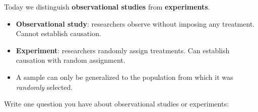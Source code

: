 \documentclass[10pt]{article}
\begin{document}
\noindent Today we distinguish \textbf{observational studies} from \textbf{experiments}.

\vspace{0.14in}

\begin{tcolorbox}[colback=greenbg, colframe=greenacc, boxrule=0.8pt, arc=2mm,
    left=4mm, right=4mm, top=3mm, bottom=3mm]
    \small
    \begin{itemize}[leftmargin=1.3em, itemsep=8pt]
  \item \textbf{Observational study}: researchers observe without imposing any treatment.
        Cannot establish causation.
  \item \textbf{Experiment}: researchers randomly assign treatments. Can establish
        causation with random assignment.
  \item A sample can only be generalized to the population from which it was
        \emph{randomly} selected.
    \end{itemize}
\end{tcolorbox}

\vspace{0.2in}

\noindent\textcolor{slate}{\small Write one question you have about observational studies
or experiments:}\\[8pt]
\writeline\\[2pt]\writeline
\end{document}
